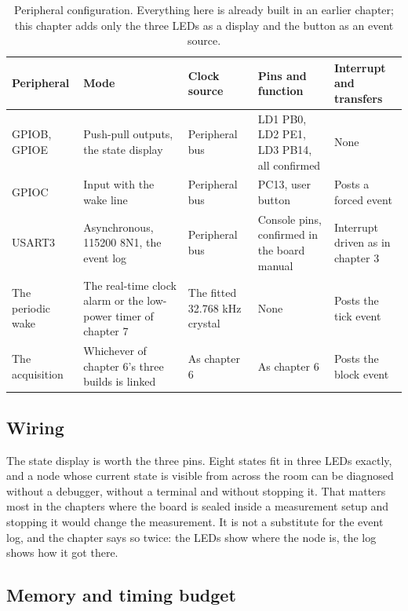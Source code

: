\begin{table}[H]\centering\small
\begin{tabular}{p{22mm}p{26mm}p{24mm}p{30mm}p{30mm}}
\toprule
Peripheral & Mode & Clock source & Pins and function & Interrupt and transfers \\
\midrule
GPIOB, GPIOE & Push-pull outputs, the state display & Peripheral bus & LD1 PB0, LD2 PE1, LD3 PB14, all confirmed & None \\
GPIOC & Input with the wake line & Peripheral bus & PC13, user button & Posts a forced event \\
USART3 & Asynchronous, 115200 8N1, the event log & Peripheral bus & Console pins, confirmed in the board manual & Interrupt driven as in chapter 3 \\
The periodic wake & The real-time clock alarm or the low-power timer of chapter 7 & The fitted 32.768 kHz crystal & None & Posts the tick event \\
The acquisition & Whichever of chapter 6's three builds is linked & As chapter 6 & As chapter 6 & Posts the block event \\
\bottomrule
\end{tabular}
\caption{Peripheral configuration. Everything here is already built in an earlier chapter; this chapter adds only the three LEDs as a display and the button as an event source.}
\end{table}

\subsection*{Wiring}


The state display is worth the three pins. Eight states fit in three LEDs
exactly, and a node whose current state is visible from across the room can be
diagnosed without a debugger, without a terminal and without stopping it. That
matters most in the chapters where the board is sealed inside a measurement
setup and stopping it would change the measurement. It is not a substitute for
the event log, and the chapter says so twice: the LEDs show where the node is,
the log shows how it got there.

\subsection*{Memory and timing budget}


